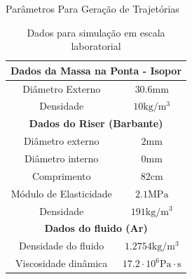 \documentclass[10pt]{beamer}
\begin{document}
\begin{frame}[fragile]{Parâmetros Para Geração de Trajetórias}

\begin{table}[!ht]
	\caption{Dados para simulação em escala laboratorial\label{escalaLaboratorial}}
	\centering
	\begin{tabular}{|c|c|}
		\hline
			\multicolumn{2}{|c|}{\textbf{Dados da Massa na Ponta - Isopor}} \\ \hline
			Diâmetro Externo & $30.6\mathrm{mm}$\\ \hline
			Densidade & $10\mathrm{kg}/\mathrm{m}^3$ \\ \hline
			\multicolumn{2}{|c|}{\textbf{Dados do Riser (Barbante)}}\\ \hline
			Diâmetro externo & $2\mathrm{mm}$\\ \hline
			Diâmetro interno & $0\mathrm{mm}$ \\ \hline
			Comprimento & $82\mathrm{cm}$ \\ \hline
			Módulo de Elasticidade & $2.1 \mathrm{MPa}$\\ \hline
			Densidade &  $191\mathrm{kg}/\mathrm{m}^3$\\ \hline
			\multicolumn{2}{|c|}{\textbf{Dados do fluido (Ar)}}\\ \hline
			Densidade do fluido &  $1.2754\mathrm{kg}/\mathrm{m}^3$\\ \hline
			Viscosidade dinâmica & $17.2\cdot 10^6 \mathrm{Pa}\cdot \mathrm{s}$ \\ \hline
		\end{tabular}
\end{table}

\end{frame}
%
%
%
\end{document}
